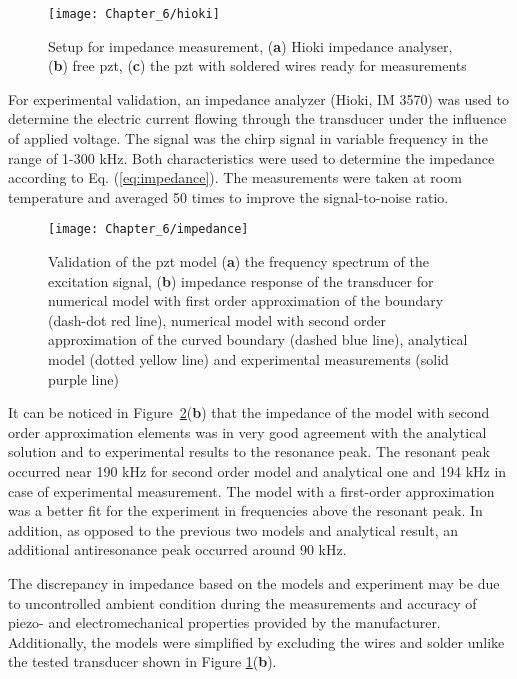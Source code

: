 \begin{figure}[!tbh]
	\begin{center}
		\texttt{[image: Chapter\_6/hioki]}
	\end{center}
	\caption{Setup for impedance measurement, (\textbf{a}) Hioki impedance analyser, (\textbf{b}) free \acl{pzt}, (\textbf{c}) the \ac{pzt} with soldered wires ready for measurements}
	\label{fig:hioki}
\end{figure}
For experimental validation, an impedance analyzer (Hioki, IM 3570) was used to determine the electric current flowing through the transducer under the influence of applied voltage. The signal was the chirp signal in variable frequency in the range of 1-300 \unit{\kHz}.
Both characteristics were used to determine the impedance according to Eq. (\ref{eq:impedance}).
The measurements were taken at room temperature and averaged 50 times to improve the signal-to-noise ratio.

\begin{figure}[!tbh]
	\begin{center}
		\texttt{[image: Chapter\_6/impedance]}
	\end{center}
	\caption{Validation of the \acl{pzt} model (\textbf{a}) the frequency spectrum of the excitation signal, (\textbf{b}) impedance response of the transducer for numerical model with first order approximation of the boundary (dash-dot red line), numerical model with second order approximation of the curved boundary (dashed blue line), analytical model (dotted yellow line) and experimental measurements (solid purple line)}
	\label{fig:impedance}
\end{figure}

It can be noticed in Figure~\ref{fig:impedance}(\textbf{b}) that the impedance of the model with second order approximation elements was in very good agreement with the analytical solution and to experimental results to the resonance peak.
The resonant peak occurred near 190 \unit{\kHz} for second order model and analytical one and 194 \unit{\kHz} in case of experimental measurement.
The model with a first-order approximation was a better fit for the experiment in frequencies above the resonant peak.
In addition, as opposed to the previous two models and analytical result, an additional antiresonance peak occurred around 90 \unit{\kHz}.

The discrepancy in impedance based on the models and experiment may be due to uncontrolled ambient condition during the measurements and accuracy of piezo- and electromechanical properties provided by the manufacturer. 
Additionally, the models were simplified by excluding the wires and solder unlike the tested transducer shown in Figure \ref{fig:hioki}(\textbf{b}).